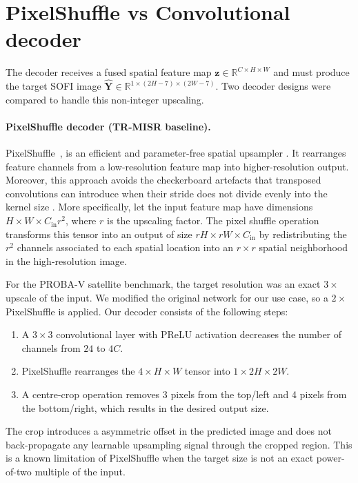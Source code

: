 \section{PixelShuffle vs Convolutional decoder}
\label{sec:decoder}

The decoder receives a fused spatial feature map $\mathbf{z} \in \mathbb{R}^{C \times H \times W}$
and must produce the target SOFI image $\hat{\mathbf{Y}} \in \mathbb{R}^{1 \times (2H-7) \times (2W-7)}$.
Two decoder designs were compared to handle this non-integer upscaling.

\paragraph{PixelShuffle decoder (TR-MISR baseline).}
PixelShuffle~\cite{shi2016pixelshuffle}, is an efficient and parameter-free
spatial upsampler \cite{TR-MISR-original}. It rearranges feature channels from a low-resolution feature map 
into higher-resolution output. Moreover, this approach avoids the checkerboard artefacts that 
transposed convolutions can introduce when their stride does not divide evenly into the kernel size 
\cite{odena2016deconvolution}.
More specifically, let the input feature map have dimensions $H \times W \times C_{\text{in}} r^2$, 
where $r$ is the upscaling factor. The pixel shuffle operation transforms this tensor into an output 
of size $rH \times rW \times C_{\text{in}}$ by redistributing the $r^2$ channels associated 
to each spatial location into an $r \times r$ spatial neighborhood in the high-resolution image.

For the PROBA-V satellite benchmark, the target resolution was an exact $3\times$ upscale of the input. 
We modified the original network for our use case, so a $2\times$ PixelShuffle is applied.
Our decoder consists of the following steps:
\begin{enumerate}
  \item A $3 \times 3$ convolutional layer with PReLU activation decreases the number of channels from $24$ to $4C$.
  \item PixelShuffle rearranges the 
  $4 \times H \times W$ tensor into $1 \times 2H \times 2W$.
  \item A centre-crop operation removes 3 pixels from the top/left and 4 pixels from the bottom/right, which results in the desired output size.
\end{enumerate}
The crop introduces a asymmetric offset in the predicted image and 
does not back-propagate any learnable upsampling signal through the cropped region. 
This is a known limitation of PixelShuffle when the target size is not an exact power-of-two multiple of the input.

